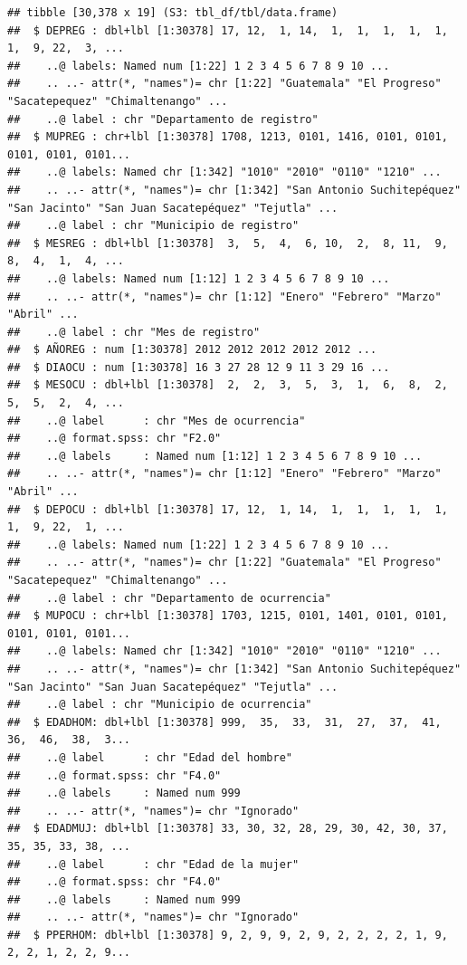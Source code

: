 \documentclass[
]{article}
\begin{document}
\begin{verbatim}
## tibble [30,378 x 19] (S3: tbl_df/tbl/data.frame)
##  $ DEPREG : dbl+lbl [1:30378] 17, 12,  1, 14,  1,  1,  1,  1,  1,  1,  9, 22,  3, ...
##    ..@ labels: Named num [1:22] 1 2 3 4 5 6 7 8 9 10 ...
##    .. ..- attr(*, "names")= chr [1:22] "Guatemala" "El Progreso" "Sacatepequez" "Chimaltenango" ...
##    ..@ label : chr "Departamento de registro"
##  $ MUPREG : chr+lbl [1:30378] 1708, 1213, 0101, 1416, 0101, 0101, 0101, 0101, 0101...
##    ..@ labels: Named chr [1:342] "1010" "2010" "0110" "1210" ...
##    .. ..- attr(*, "names")= chr [1:342] "San Antonio Suchitepéquez" "San Jacinto" "San Juan Sacatepéquez" "Tejutla" ...
##    ..@ label : chr "Municipio de registro"
##  $ MESREG : dbl+lbl [1:30378]  3,  5,  4,  6, 10,  2,  8, 11,  9,  8,  4,  1,  4, ...
##    ..@ labels: Named num [1:12] 1 2 3 4 5 6 7 8 9 10 ...
##    .. ..- attr(*, "names")= chr [1:12] "Enero" "Febrero" "Marzo" "Abril" ...
##    ..@ label : chr "Mes de registro"
##  $ AÑOREG : num [1:30378] 2012 2012 2012 2012 2012 ...
##  $ DIAOCU : num [1:30378] 16 3 27 28 12 9 11 3 29 16 ...
##  $ MESOCU : dbl+lbl [1:30378]  2,  2,  3,  5,  3,  1,  6,  8,  2,  5,  5,  2,  4, ...
##    ..@ label      : chr "Mes de ocurrencia"
##    ..@ format.spss: chr "F2.0"
##    ..@ labels     : Named num [1:12] 1 2 3 4 5 6 7 8 9 10 ...
##    .. ..- attr(*, "names")= chr [1:12] "Enero" "Febrero" "Marzo" "Abril" ...
##  $ DEPOCU : dbl+lbl [1:30378] 17, 12,  1, 14,  1,  1,  1,  1,  1,  1,  9, 22,  1, ...
##    ..@ labels: Named num [1:22] 1 2 3 4 5 6 7 8 9 10 ...
##    .. ..- attr(*, "names")= chr [1:22] "Guatemala" "El Progreso" "Sacatepequez" "Chimaltenango" ...
##    ..@ label : chr "Departamento de ocurrencia"
##  $ MUPOCU : chr+lbl [1:30378] 1703, 1215, 0101, 1401, 0101, 0101, 0101, 0101, 0101...
##    ..@ labels: Named chr [1:342] "1010" "2010" "0110" "1210" ...
##    .. ..- attr(*, "names")= chr [1:342] "San Antonio Suchitepéquez" "San Jacinto" "San Juan Sacatepéquez" "Tejutla" ...
##    ..@ label : chr "Municipio de ocurrencia"
##  $ EDADHOM: dbl+lbl [1:30378] 999,  35,  33,  31,  27,  37,  41,  36,  46,  38,  3...
##    ..@ label      : chr "Edad del hombre"
##    ..@ format.spss: chr "F4.0"
##    ..@ labels     : Named num 999
##    .. ..- attr(*, "names")= chr "Ignorado"
##  $ EDADMUJ: dbl+lbl [1:30378] 33, 30, 32, 28, 29, 30, 42, 30, 37, 35, 35, 33, 38, ...
##    ..@ label      : chr "Edad de la mujer"
##    ..@ format.spss: chr "F4.0"
##    ..@ labels     : Named num 999
##    .. ..- attr(*, "names")= chr "Ignorado"
##  $ PPERHOM: dbl+lbl [1:30378] 9, 2, 9, 9, 2, 9, 2, 2, 2, 2, 1, 9, 2, 2, 1, 2, 2, 9...

\end{verbatim}
\end{document}

